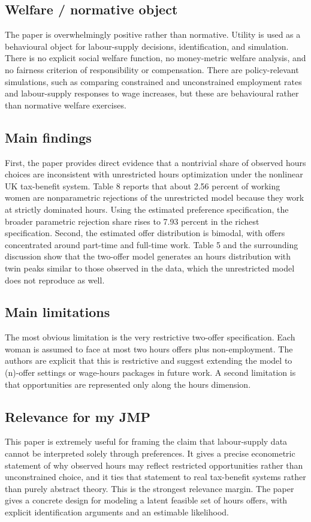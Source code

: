 \documentclass[11pt,a4paper]{article}
\begin{document}
\subsection*{Welfare / normative object}
The paper is overwhelmingly positive rather than normative. Utility is used as a behavioural object for labour-supply decisions, identification, and simulation. There is no explicit social welfare function, no money-metric welfare analysis, and no fairness criterion of responsibility or compensation. There are policy-relevant simulations, such as comparing constrained and unconstrained employment rates and labour-supply responses to wage increases, but these are behavioural rather than normative welfare exercises.

\subsection*{Main findings}
First, the paper provides direct evidence that a nontrivial share of observed hours choices are inconsistent with unrestricted hours optimization under the nonlinear UK tax-benefit system. Table 8 reports that about 2.56 percent of working women are nonparametric rejections of the unrestricted model because they work at strictly dominated hours. Using the estimated preference specification, the broader parametric rejection share rises to 7.93 percent in the richest specification. Second, the estimated offer distribution is bimodal, with offers concentrated around part-time and full-time work. Table 5 and the surrounding discussion show that the two-offer model generates an hours distribution with twin peaks similar to those observed in the data, which the unrestricted model does not reproduce as well.

\subsection*{Main limitations}
The most obvious limitation is the very restrictive two-offer specification. Each woman is assumed to face at most two hours offers plus non-employment. The authors are explicit that this is restrictive and suggest extending the model to (n)-offer settings or wage-hours packages in future work. A second limitation is that opportunities are represented only along the hours dimension.

\subsection*{Relevance for my JMP}
This paper is extremely useful for framing the claim that labour-supply data cannot be interpreted solely through preferences. It gives a precise econometric statement of why observed hours may reflect restricted opportunities rather than unconstrained choice, and it ties that statement to real tax-benefit systems rather than purely abstract theory. This is the strongest relevance margin. The paper gives a concrete design for modeling a latent feasible set of hours offers, with explicit identification arguments and an estimable likelihood.
\end{document}
